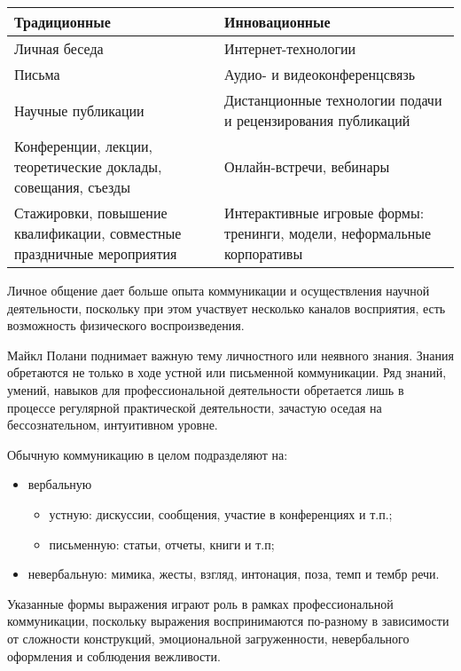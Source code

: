 \begin{table}[h!]
\centering
\begin{tabular}{|p{6cm}|p{6cm}|}
\hline
\textbf{Традиционные} & \textbf{Инновационные} \\ \hline
Личная беседа & Интернет-технологии \\ \hline
Письма & Аудио- и видеоконференцсвязь \\ \hline
Научные публикации & Дистанционные технологии подачи и рецензирования публикаций \\ \hline
Конференции, лекции, теоретические доклады, совещания, съезды & Онлайн-встречи, вебинары \\ \hline
Стажировки, повышение квалификации, совместные праздничные мероприятия & Интерактивные игровые формы: тренинги, модели, неформальные корпоративы \\ \hline
\end{tabular}

\label{table:traditional_vs_innovative}
\end{table}

Личное общение дает больше опыта коммуникации и осуществления
научной деятельности, поскольку при этом участвует несколько каналов восприятия, 
есть возможность физического воспроизведения.

Майкл Полани поднимает важную тему личностного или неявного
знания. Знания обретаются не только в ходе устной или письменной коммуникации.
Ряд знаний, умений,
навыков для профессиональной деятельности обретается лишь в процессе регулярной
практической деятельности, зачастую оседая на бессознательном, интуитивном уровне.

Обычную коммуникацию в целом подразделяют на:
\begin{itemize}
    \item вербальную
        \begin{itemize}
            \item устную: дискуссии, сообщения, участие в конференциях и т.п.;
            \item письменную: статьи, отчеты, книги и т.п;
        \end{itemize}
    \item невербальную: мимика, жесты, взгляд, интонация, поза, темп и тембр речи.
\end{itemize}
Указанные формы выражения играют роль в рамках профессиональной коммуникации, поскольку выражения воспринимаются по-разному в зависимости от сложности конструкций, эмоциональной загруженности,
невербального оформления и соблюдения вежливости.



